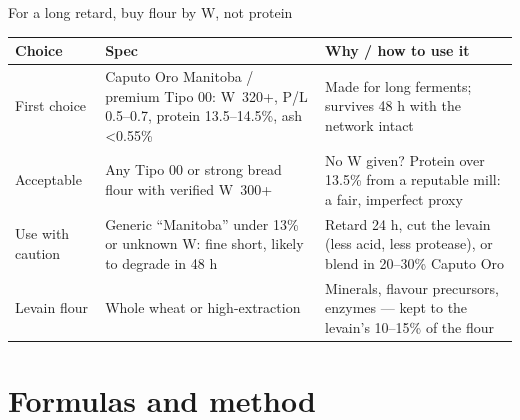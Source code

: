 \documentclass[aspectratio=169,11pt]{beamer}
\newcommand{\tablesetup}{\renewcommand{\arraystretch}{1.2}\setlength{\tabcolsep}{4pt}}
\newenvironment{tablebox}[1][\footnotesize]{\par\tablesetup#1}{\par}
\begin{document}
\begin{frame}{For a long retard, buy flour by W, not protein}
  \begin{tablebox}[\footnotesize\renewcommand{\arraystretch}{1.05}]
  \begin{tabularx}{\linewidth}{@{}L{2.0cm}YY@{}}
    \toprule
    \textbf{Choice} & \textbf{Spec} & \textbf{Why / how to use it} \\
    \midrule
    First choice & Caputo Oro Manitoba / premium Tipo 00: W~320+, P/L 0.5--0.7, protein 13.5--14.5\%, ash <0.55\% & Made for long ferments; survives 48 h with the network intact \\
    Acceptable & Any Tipo 00 or strong bread flour with verified W~300+ & No W given? Protein over 13.5\% from a reputable mill: a fair, imperfect proxy \\
    Use with caution & Generic “Manitoba” under 13\% or unknown W: fine short, likely to degrade in 48 h & Retard 24 h, cut the levain (less acid, less protease), or blend in 20--30\% Caputo Oro \\
    Levain flour & Whole wheat or high-extraction & Minerals, flavour precursors, enzymes --- kept to the levain's 10--15\% of the flour \\
    \bottomrule
  \end{tabularx}
  \end{tablebox}
\end{frame}

\section{Formulas and method}
\end{document}
